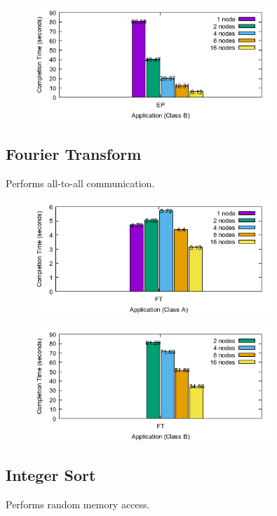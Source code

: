 \documentclass[a4paper]{article}
\begin{document}
\begin{figure}[H]
\centering
\includegraphics[width=0.8\textwidth]{figures/EPvB.png}
\caption{\label{fig:EPvB}}
\end{figure}


\subsection{Fourier Transform}
Performs all-to-all communication.


\begin{figure}[H]
\centering
\includegraphics[width=0.8\textwidth]{figures/FTvA.png}
\caption{\label{fig:FTvA}}
\end{figure}

\begin{figure}[H]
\centering
\includegraphics[width=0.8\textwidth]{figures/FTvB.png}
\caption{\label{fig:FTvB}}
\end{figure}

\subsection{Integer Sort}
Performs random memory access.
\end{document}
